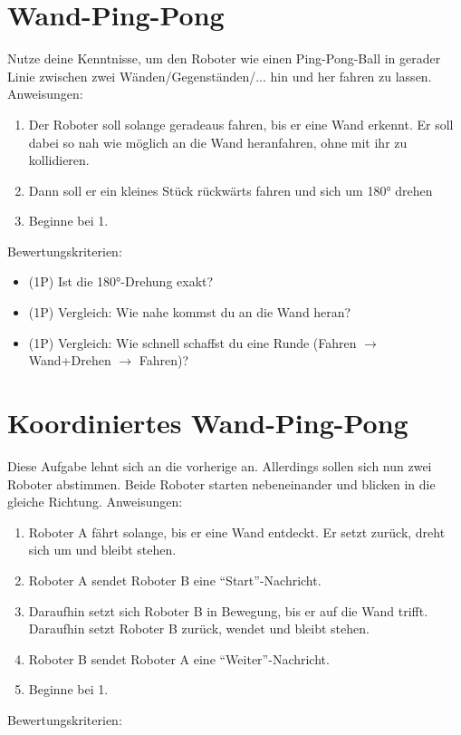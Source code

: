 \documentclass[
	12pt,
	article,
	type=bsc, %
	colorbacktitle,
	instlogo,
	accentcolor=tud1c,
	draft,
	german,
	twoside
]{tudexercise}
\begin{document}
	\newpage
	\section{Wand-Ping-Pong}
	Nutze deine Kenntnisse, um den Roboter wie einen Ping-Pong-Ball in gerader Linie zwischen zwei Wänden/Gegenständen/... hin und her fahren zu lassen.
	Anweisungen:
	\begin{enumerate}
	\item Der Roboter soll solange geradeaus fahren, bis er eine Wand erkennt. Er soll dabei so nah wie möglich an die Wand heranfahren, ohne mit ihr zu kollidieren.
	\item Dann soll er ein kleines Stück rückwärts fahren und sich um 180° drehen
	\item Beginne bei 1.
	\end{enumerate}
	
	Bewertungskriterien:
	\begin{itemize}
	\item (1P) Ist die 180°-Drehung exakt?
	\item (1P) Vergleich: Wie nahe kommst du an die Wand heran?
	\item (1P) Vergleich: Wie schnell schaffst du eine Runde (Fahren $\rightarrow$ Wand+Drehen $\rightarrow$ Fahren)?
	\end{itemize}
	
	\section{Koordiniertes Wand-Ping-Pong}
	Diese Aufgabe lehnt sich an die vorherige an. Allerdings sollen sich nun zwei Roboter abstimmen. Beide Roboter starten nebeneinander und blicken in die gleiche Richtung.
	Anweisungen:
	\begin{enumerate}
	\item Roboter A fährt solange, bis er eine Wand entdeckt. Er setzt zurück, dreht sich um und bleibt stehen.
	\item Roboter A sendet Roboter B eine “Start”-Nachricht.
	\item Daraufhin setzt sich Roboter B in Bewegung, bis er auf die Wand trifft. Daraufhin setzt Roboter B zurück, wendet und bleibt stehen.
	\item Roboter B sendet Roboter A eine “Weiter”-Nachricht.
	\item Beginne bei 1.
	\end{enumerate}
	
	Bewertungskriterien:
	
\end{document}
